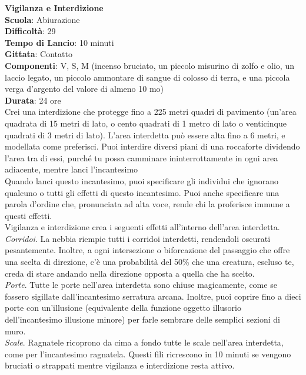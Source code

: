 \begin{multicols}{2}
\medskip\textbf{Vigilanza e Interdizione}\\
\textbf{Scuola}: Abiurazione\\
\textbf{Difficoltà}: 29\\
\textbf{Tempo di Lancio}: 10 minuti\\
\textbf{Gittata}: Contatto\\
\textbf{Componenti}: V, S, M (incenso bruciato, un piccolo misurino di zolfo e olio, un laccio legato, un piccolo ammontare di sangue di colosso di terra, e una piccola verga d'argento del valore di almeno 10 mo)\\
\textbf{Durata}: 24 ore\\
Crei una interdizione che protegge fino a 225 metri quadri di pavimento (un'area quadrata di 15 metri di lato, o cento quadrati di 1 metro di lato o venticinque quadrati di 3 metri di lato). L'area interdetta può essere alta fino a 6 metri, e modellata come preferisci. Puoi interdire diversi piani di una roccaforte dividendo l'area tra di essi, purché tu possa camminare ininterrottamente in ogni area adiacente, mentre lanci l'incantesimo\\
Quando lanci questo incantesimo, puoi specificare gli individui che ignorano qualcuno o tutti gli effetti di questo incantesimo. Puoi anche specificare una parola d'ordine che, pronunciata ad alta voce, rende chi la proferisce immune a questi effetti.\\
Vigilanza e interdizione crea i seguenti effetti all'interno dell'area interdetta.\\
\textit{Corridoi}. La nebbia riempie tutti i corridoi interdetti, rendendoli oscurati pesantemente. Inoltre, a ogni intersezione o biforcazione del passaggio che offre una scelta di direzione, c'è una probabilità del 50\% che una creatura, escluso te, creda di stare andando nella direzione opposta a quella che ha scelto.\\
\textit{Porte}. Tutte le porte nell'area interdetta sono chiuse magicamente, come se fossero sigillate dall'incantesimo serratura arcana. Inoltre, puoi coprire fino a dieci porte con un'illusione (equivalente della funzione oggetto illusorio dell'incantesimo illusione minore) per farle sembrare delle semplici sezioni di muro.\\
\textit{Scale}. Ragnatele ricoprono da cima a fondo tutte le scale nell'area interdetta, come per l'incantesimo ragnatela. Questi fili ricrescono in 10 minuti se vengono bruciati o strappati mentre vigilanza e interdizione resta attivo.\\

\end{multicols}
